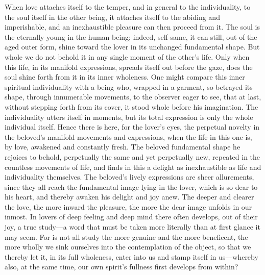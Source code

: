 \documentclass[12pt,a4paper]{book}
\begin{document}
When love attaches itself to the temper, and in general to the
individuality, to the soul itself in the other being, it attaches itself
to the abiding and imperishable, and an inexhaustible pleasure can then
proceed from it. The soul is the eternally young in the human being;
indeed, self-same, it can still, out of the aged outer form, shine toward
the lover in its unchanged fundamental shape. But whole we do not behold
it in any single moment of the other's life. Only when this life, in its
manifold expressions, spreads itself out before the gaze, does the soul
shine forth from it in its inner wholeness. One might compare this inner
spiritual individuality with a being who, wrapped in a garment, so
betrayed its shape, through innumerable movements, to the observer eager
to see, that at last, without stepping forth from its cover, it stood
whole before his imagination. The individuality utters itself in moments,
but its total expression is only the whole individual itself. Hence there
is here, for the lover's eyes, the perpetual novelty in the beloved's
manifold movements and expressions, when the life in this one is, by love,
awakened and constantly fresh. The beloved fundamental shape he rejoices
to behold, perpetually the same and yet perpetually new, repeated in the
countless movements of life, and finds in this a delight as inexhaustible
as life and individuality themselves. The beloved's lively expressions are sheer allurements, since they all
reach the fundamental image lying in the lover, which is so dear to his
heart, and thereby awaken his delight and joy anew. The deeper and clearer
the love, the more inward the pleasure, the more the dear image unfolds in
our inmost. In lovers of deep feeling and deep mind there often develops,
out of their joy, a true study---a word that must be taken more literally
than at first glance it may seem. For is not all study the more genuine
and the more beneficent, the more wholly we sink ourselves into the
contemplation of the object, so that we thereby let it, in its full
wholeness, enter into us and stamp itself in us---whereby also, at the same
time, our own spirit's fullness first develops from within?
\end{document}
